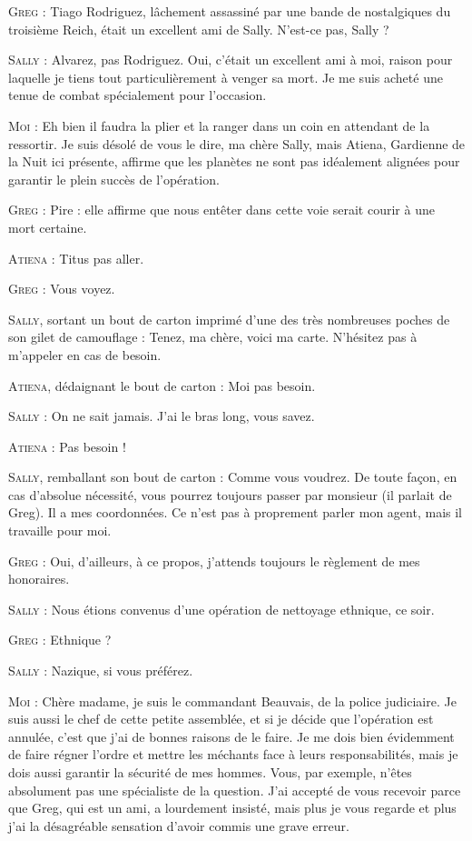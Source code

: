 \begin{dialogue}
\textsc{Greg} : Tiago Rodriguez, lâchement assassiné par une bande de nostalgiques du troisième Reich, était un excellent ami de Sally. N’est-ce pas, Sally ?

\textsc{Sally} : Alvarez, pas Rodriguez. Oui, c’était un excellent ami à moi, raison pour laquelle je tiens tout particulièrement à venger sa mort. Je me suis acheté une tenue de combat spécialement pour l’occasion.

\textsc{Moi} : Eh bien il faudra la plier et la ranger dans un coin en attendant de la ressortir. Je suis désolé de vous le dire, ma chère Sally, mais Atiena, Gardienne de la Nuit ici présente, affirme que les planètes ne sont pas idéalement alignées pour garantir le plein succès de l’opération.

\textsc{Greg} : Pire : elle affirme que nous entêter dans cette voie serait courir à une mort certaine.

\textsc{Atiena} : Titus pas aller.

\textsc{Greg} : Vous voyez.

\textsc{Sally}, sortant un bout de carton imprimé d’une des très nombreuses poches de son gilet de camouflage : Tenez, ma chère, voici ma carte. N’hésitez pas à m’appeler en cas de besoin.

\textsc{Atiena}, dédaignant le bout de carton : Moi pas besoin.

\textsc{Sally} : On ne sait jamais. J’ai le bras long, vous savez.

\textsc{Atiena} : Pas besoin !

\textsc{Sally}, remballant son bout de carton : Comme vous voudrez. De toute façon, en cas d’absolue nécessité, vous pourrez toujours passer par monsieur (il parlait de Greg). Il a mes coordonnées. Ce n’est pas à proprement parler mon agent, mais il travaille pour moi.

\textsc{Greg} : Oui, d’ailleurs, à ce propos, j’attends toujours le règlement de mes honoraires.

\textsc{Sally} : Nous étions convenus d’une opération de nettoyage ethnique, ce soir.

\textsc{Greg} : Ethnique ?

\textsc{Sally} : Nazique, si vous préférez.

\textsc{Moi} : Chère madame, je suis le commandant Beauvais, de la police judiciaire. Je suis aussi le chef de cette petite assemblée, et si je décide que l’opération est annulée, c’est que j’ai de bonnes raisons de le faire. Je me dois bien évidemment de faire régner l’ordre et mettre les méchants face à leurs responsabilités, mais je dois aussi garantir la sécurité de mes hommes. Vous, par exemple, n’êtes absolument pas une spécialiste de la question. J’ai accepté de vous recevoir parce que Greg, qui est un ami, a lourdement insisté, mais plus je vous regarde et plus j’ai la désagréable sensation d’avoir commis une grave erreur.


\end{dialogue}
